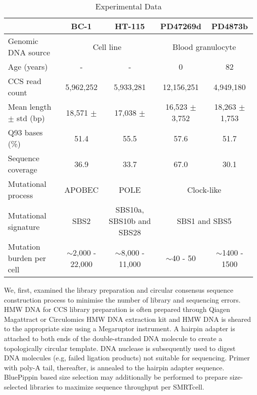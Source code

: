 \begin{table}[h]
\caption{Experimental Data}
\label{tab:CCS-sequence-statistics}
\begin{adjustbox}{max width=1.1\textwidth,center}
\begin{tabular}{l|cccc}
                                     & BC-1 & HT-115 & PD47269d & PD4873b \\ \hline
Genomic DNA source                   & \multicolumn{2}{c}{Cell line} & \multicolumn{2}{c}{Blood granulocyte} \\  \hline
Age (years)                 		 & - & - & 0 & 82  \\ \hline
CCS read count                       &  5,962,252 &  5,933,281 & 12,156,251 & 4,949,180 \\ \hline
Mean length $\pm$ std (bp)  & 18,571 $\pm$     & 17,038 $\pm$   &  16,523 $\pm$ 3,752 & 18,263 $\pm$ 1,753 \\ \hline
Q93 bases (\%) 						 & 51.4 & 55.5 & 57.6 & 51.7 \\ \hline
Sequence coverage 				     & 36.9 & 33.7 & 67.0 & 30.1 \\ \hline
Mutational process   			     & APOBEC & POLE & \multicolumn{2}{c}{Clock-like} \\ \hline
Mutational signature 				 & SBS2   & SBS10a, SBS10b and SBS28 & \multicolumn{2}{c}{SBS1 and SBS5} \\ \hline
Mutation burden per cell 		     & $\sim$2,000 - 22,000 & $\sim$8,000 - 11,000 & $\sim$40 - 50 & $\sim$1400 - 1500 \\ \hline 
\end{tabular}
\end{adjustbox} 
\end{table}

We, first, examined the library preparation and circular consensus sequence construction process to minimise the number of library and sequencing errors. HMW DNA for CCS library preparation is often prepared through Qiagen Magattract or Circulomics HMW DNA extraction kit and HMW DNA is sheared to the appropriate size using a Megaruptor instrument. A hairpin adapter is attached to both ends of the double-stranded DNA molecule to create a topologically circular template. DNA nuclease is subsequently used to digest DNA molecules (e.g, failed ligation products) not suitable for sequencing. Primer with poly-A tail, thereafter, is annealed to the hairpin adapter sequence. BluePippin based size selection may additionally be performed to prepare size-selected libraries to maximize sequence throughput per SMRTcell. 

